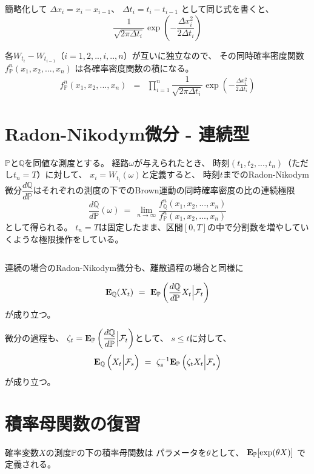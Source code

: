 \documentclass[uplatex,a4j,12pt,dvipdfmx]{jsarticle}
\begin{document}
簡略化して
$\Delta x_{i} = x_{i} - x_{i-1}$、
$\Delta t_{i} = t_{i} - t_{i-1}$
として同じ式を書くと、
%
$$
	\displaystyle
	\dfrac{1}{ \sqrt{2 \pi \Delta t_{i} } }
	\exp \left( {- \frac{ \Delta  x_{i}^{2}}{ 2 \Delta t_{i}  } } \right)
$$
%

各$W_{t_{i}} - W_{t_{i-1}}$（$i=1,2,..,i,..,n$）が互いに独立なので、
その同時確率密度関数
$f^{n}_{\mathbb{P}} (x_{1} , x_{2} , ... ,x_{n})$
は各確率密度関数の積になる。
%
\begin{eqnarray*}
	f^{n}_{\mathbb{P}} (x_{1} , x_{2} , ... ,x_{n})
	&=&
	\prod_{i=1}^{n}
	\dfrac{1}{ \sqrt{2 \pi \Delta t_{i} } }
	\exp \left( {- \frac{ \Delta  x_{i}^{2}}{ 2 \Delta t_{i}  } } \right)
\end{eqnarray*}
%

\section{Radon-Nikodym微分 - 連続型}

$\mathbb{P}$と$\mathbb{Q}$を同値な測度とする。
経路$\omega$が与えられたとき、
時刻$(t_{1},t_{2},...,t_{n})$（ただし$t_{n}=T$）に対して、
$x_{i} = W_{t_{i}}(\omega)$と定義すると、
時刻$t$までのRadon-Nikodym微分$\dfrac{d \mathbb{Q} }{d \mathbb{P} }$はそれぞれの測度の下でのBrown運動の同時確率密度の比の連続極限
$$
	\dfrac{d \mathbb{Q} }{d \mathbb{P} }(\omega)
	\ = \
	\lim_{n \to \infty}
	\dfrac{ f^{n}_{ \mathbb{Q}} (x_{1},x_{2},...,x_{n}) }{ f^{n}_{ \mathbb{P}} (x_{1},x_{2},...,x_{n}) }
$$
として得られる。
$t_{n}=T$は固定したまま、区間$[0,T]$の中で分割数を増やしていくような極限操作をしている。

${}$

連続の場合のRadon-Nikodym微分も、離散過程の場合と同様に

$$
	{\bf E}_{\mathbb{Q}}
	(X_{t})
	\ = \
	{\bf E}_{\mathbb{P}}
	\left( \dfrac{d \mathbb{Q} }{d \mathbb{P} } X_{t} \Big| \mathcal{F}_{t} \right)
$$
が成り立つ。

微分の過程も、
$\zeta_{t} = {\bf E}_{\mathbb{P}} \left( \dfrac{d \mathbb{Q} }{d \mathbb{P} } \Big| \mathcal{F}_{t} \right)$として、
$s \leq t$に対して、
$$
	{\bf E}_{\mathbb{Q}}
	\left( X_{t} \Big| \mathcal{F}_{s} \right)
	\ = \
	\zeta_{s}^{-1}
	{\bf E}_{\mathbb{P}}
	\left( \zeta_{t} X_{t} \Big| \mathcal{F}_{s} \right)
$$
が成り立つ。
\section{積率母関数の復習}

確率変数$X$の測度$\mathbb{P}$の下の積率母関数は
パラメータを$\theta$として、
${\bf E}_{\mathbb{P}}[ \exp( \theta X ) ]$
で定義される。
\end{document}
